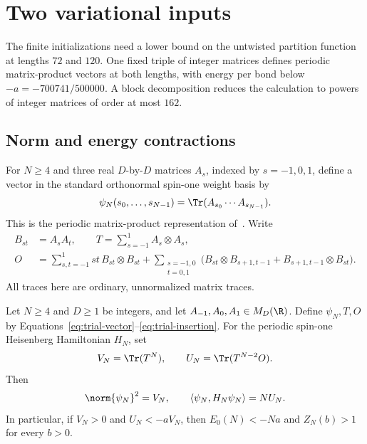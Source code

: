 \section{Two variational inputs}\label{sec:trials}

The finite initializations need a lower bound on the untwisted partition
function at lengths $72$ and $120$. One fixed triple of integer matrices
defines periodic matrix-product vectors at both lengths, with energy per bond below
$-a=-700741/500000$. A block decomposition reduces the calculation to
powers of integer matrices of order at most $162$.

\subsection{Norm and energy contractions}

For $N\ge4$ and three real $D$-by-$D$ matrices $A_s$, indexed by $s=-1,0,1$, define
a vector in the standard orthonormal spin-one weight basis by
\begin{equation}\label{eq:trial-vector}
 \psi_N(s_0,\ldots,s_{N-1})
 =\Tr(A_{s_0}\cdots A_{s_{N-1}}).
\end{equation}
This is the periodic matrix-product representation
of~\cite[Section~2.1, Equations~(2)--(3)]{PerezGarcia2007}.
Write
\begin{align}
 B_{st}&=A_sA_t,\qquad T=\sum_{s=-1}^1 A_s\otimes A_s,
 \label{eq:trial-transfer}\\
 O&=\sum_{s,t=-1}^1 st\,B_{st}\otimes B_{st}
   +\sum_{\substack{s=-1,0\\t=0,1}}
    \bigl(B_{st}\otimes B_{s+1,t-1}
       +B_{s+1,t-1}\otimes B_{st}\bigr).
 \label{eq:trial-insertion}
\end{align}
All traces here are ordinary, unnormalized matrix traces.

\begin{lemma}\label{lem:trial-contraction}
Let $N\ge4$ and $D\ge1$ be integers, and let $A_{-1},A_0,A_1\in M_D(\R)$.
Define $\psi_N,T,O$ by Equations~\eqref{eq:trial-vector}--\eqref{eq:trial-insertion}.
For the periodic spin-one Heisenberg Hamiltonian $H_N$, set
\[
 V_N=\Tr(T^N),\qquad U_N=\Tr(T^{N-2}O).
\]
Then
\[
 \norm{\psi_N}^2=V_N,\qquad
 \langle\psi_N,H_N\psi_N\rangle=NU_N.
\]
In particular, if $V_N>0$ and $U_N<-aV_N$, then
$E_0(N)<-Na$ and $Z_N(b)>1$ for every $b>0$.
\end{lemma}


